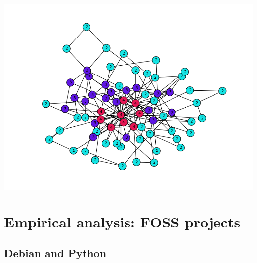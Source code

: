\documentclass[ignorenonframetext,red,8pt]{beamer}
\begin{document}
\begin{frame}
\begin{center}
\includegraphics[scale=0.25]{img/knum_colors}
\end{center}

\end{frame}

\section{Empirical analysis: FOSS projects}

\subsection{Debian and Python}
\end{document}

